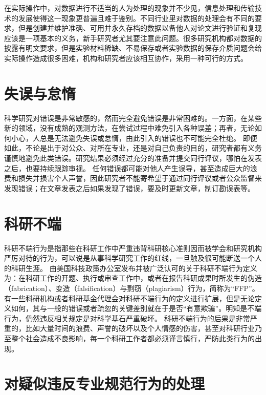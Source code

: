 \documentclass[conference]{IEEEtran}
\begin{document}
在实际操作中，对数据进行不适当的人为处理的现象并不少见，信息处理和传输技术的发展使得这一现象更普遍且难于鉴别。不同行业里对数据的处理会有不同的要求，但是创建并维护准确、可用并永久存档的数据以备他人对论文进行验证和复现应该是一项基本的义务，新手研究者尤其要注意此问题。很多研究机构都对数据的披露有明文要求，但是实验材料稀缺、不易保存或者实验数据的保存介质问题会给实际操作造成很多困难，机构和研究者应该相互协作，采用一种可行的方式。


\section{失误与怠惰}

科学研究对错误是非常敏感的，然而完全避免错误是非常困难的。一方面，在某些新的领域，没有成熟的观测方法，在尝试过程中难免引入各种误差；再者，无论如何小心，人总是无法避免失误或怠惰，由此引入的错误也不可能完全杜绝。
即便如此，不论是出于对公众、对所在专业，还是对自己负责的目的，研究者都有义务谨慎地避免此类错误。研究结果必须经过充分的准备并提交同行评议，哪怕在发表之后，也要持续跟踪审视。
任何错误都可能对他人产生误导，甚至造成巨大的浪费和损失并损害个人声誉，因此研究者不能寄希望于通过同行评议或者公众监督来发现错误；在文章发表之后如果发现了错误，要及时更新文章，制订勘误表等。

\section{科研不端}

科研不端行为是指那些在科研工作中严重违背科研核心准则因而被学会和研究机构严厉对待的行为，可以说是从事科学研究工作的红线，一旦触及很可能断送一个人的科研生涯。
由美国科技政策办公室发布并被广泛认可的关于科研不端行为定义为：在科研工作的开题、执行或审查工作中，或者在报告科研成果时所发生的伪造（fabrication）、变造（falsification）与剽窃（plagiarism）行为，简称为“FFP”。有一些科研机构或者科研基金代理会对科研不端行为的定义进行扩展，但是无论定义如何，其与一般的错误或者疏忽的关键差别就在于是否“有意欺骗”。明知是不端行为，仍然违反相关规定是对科学基石严重破坏。
科研不端行为的后果是非常严重的，比如大量时间的浪费、声誉的破坏以及个人情感的伤害，甚至对科研行业乃至整个社会造成不良影响，每一个科研工作者都必须谨言慎行，严防此类行为的出现。

\section{对疑似违反专业规范行为的处理}
\end{document}
